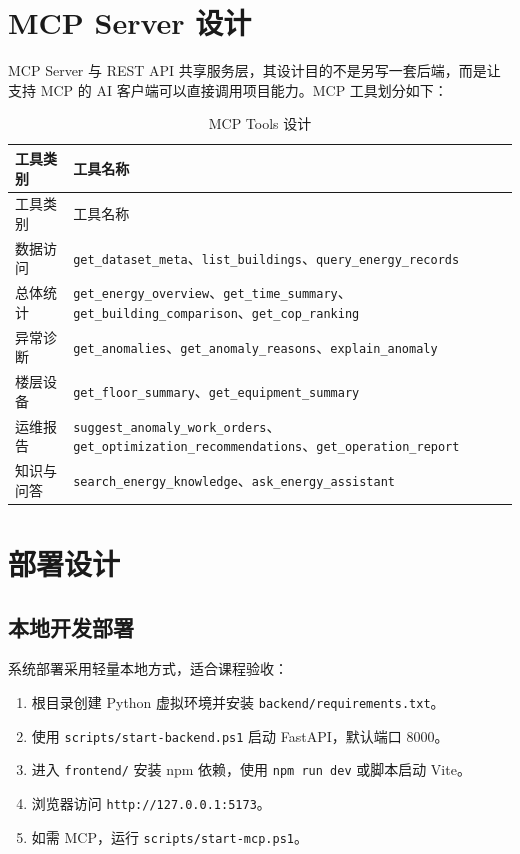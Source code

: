\documentclass[12pt,a4paper]{ctexart}
\newcommand{\code}[1]{{\footnotesize\nolinkurl{#1}}}
\begin{document}
\section{MCP Server 设计}
MCP Server 与 REST API 共享服务层，其设计目的不是另写一套后端，而是让支持 MCP 的 AI 客户端可以直接调用项目能力。MCP 工具划分如下：
\begin{longtable}{p{4.5cm}p{9.2cm}}
\caption{MCP Tools 设计}\\
\toprule
工具类别 & 工具名称 \\
\midrule
\endfirsthead
\toprule
工具类别 & 工具名称 \\
\midrule
\endhead
数据访问 & \code{get_dataset_meta}、\code{list_buildings}、\code{query_energy_records} \\
总体统计 & \code{get_energy_overview}、\code{get_time_summary}、\code{get_building_comparison}、\code{get_cop_ranking} \\
异常诊断 & \code{get_anomalies}、\code{get_anomaly_reasons}、\code{explain_anomaly} \\
楼层设备 & \code{get_floor_summary}、\code{get_equipment_summary} \\
运维报告 & \code{suggest_anomaly_work_orders}、\code{get_optimization_recommendations}、\code{get_operation_report} \\
知识与问答 & \code{search_energy_knowledge}、\code{ask_energy_assistant} \\
\bottomrule
\end{longtable}

\section{部署设计}
\subsection{本地开发部署}
系统部署采用轻量本地方式，适合课程验收：
\begin{enumerate}
    \item 根目录创建 Python 虚拟环境并安装 \code{backend/requirements.txt}。
    \item 使用 \code{scripts/start-backend.ps1} 启动 FastAPI，默认端口 8000。
    \item 进入 \code{frontend/} 安装 npm 依赖，使用 \code{npm run dev} 或脚本启动 Vite。
    \item 浏览器访问 \code{http://127.0.0.1:5173}。
    \item 如需 MCP，运行 \code{scripts/start-mcp.ps1}。
\end{enumerate}
\end{document}
